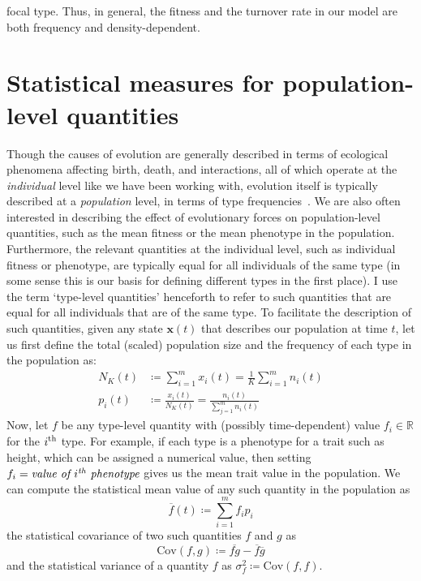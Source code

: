 focal type. Thus, in general, the fitness and the turnover rate in our model are both frequency and density-dependent.

\section{Statistical measures for population-level quantities}\label{sec_stat_measures}

Though the causes of evolution are generally described in terms of ecological phenomena affecting birth, death, and interactions, all of which operate at the \emph{individual} level like we have been working with, evolution itself is typically described at a \emph{population} level, in terms of type frequencies~\citep{bourrat_evolution_2019}. We are also often interested in describing the effect of evolutionary forces on population-level quantities, such as the mean fitness or the mean phenotype in the population. Furthermore, the relevant quantities at the individual level, such as individual fitness or phenotype, are typically equal for all individuals of the same type (in some sense this is our basis for defining different types in the first place). I use the term `type-level quantities' henceforth to refer to such quantities that are equal for all individuals that are of the same type. To facilitate the description of such quantities, given any state $\mathbf{x}(t)$ that describes our population at time $t$, let us first define the total (scaled) population size and the frequency of each type in the population as:
\begin{equation}
	\label{nD_tot_pop_and_prop_inds_defn}
	\begin{aligned}
		N_{K}(t) &\coloneqq \sum\limits_{i=1}^{m}x_i(t) = \frac{1}{K}\sum\limits_{i=1}^{m}n_i(t)\\
		p_i(t) &\coloneqq \frac{x_i(t)}{N_{K}(t)} = \frac{n_i(t)}{\sum\limits_{j=1}^{m}n_i(t)}
	\end{aligned}
\end{equation}
Now, let $f$ be any type-level quantity with (possibly time-dependent) value $f_i \in \mathbb{R}$ for the $i\textsuperscript{th}$ type. For example, if each type is a phenotype for a trait such as height, which can be assigned a numerical value, then setting $f_i = \textit{value of $i\textsuperscript{th}$ phenotype}$ gives us the mean trait value in the population. We can compute the statistical mean value of any such quantity in the population as
\begin{equation}
\label{nD_mean}
\overline{f}(t) \coloneqq \sum\limits_{i=1}^{m}f_ip_{i}
\end{equation}
the statistical covariance of two such quantities $f$ and $g$ as
\begin{equation}
\label{nD_cov}
\textrm{Cov}(f,g) \coloneqq \overline{fg} - \overline{f}\overline{g}
\end{equation}
and the statistical variance of a quantity $f$ as $\sigma^2_f \coloneqq \textrm{Cov}(f,f)$.

